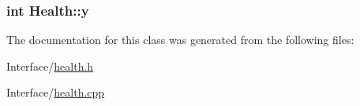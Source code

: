 \subsubsection[{\texorpdfstring{y}{y}}]{\setlength{\rightskip}{0pt plus 5cm}int Health\+::y\hspace{0.3cm}{\ttfamily [protected]}}\hypertarget{classHealth_addeb1f5a9d1929e16770074e17f8f1f2}{}\label{classHealth_addeb1f5a9d1929e16770074e17f8f1f2}


The documentation for this class was generated from the following files\+:\begin{DoxyCompactItemize}
\item 
Interface/\hyperlink{health_8h}{health.\+h}\item 
Interface/\hyperlink{health_8cpp}{health.\+cpp}\end{DoxyCompactItemize}

